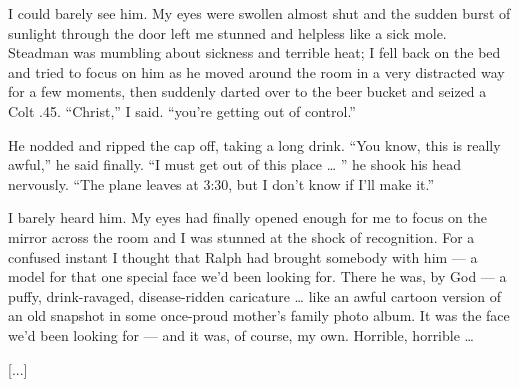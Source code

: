 \documentclass[10pt,a4paper]{article}
\begin{document}
I could barely see him. My eyes were swollen almost shut and the sudden burst of sunlight through the door left me stunned and helpless like a sick mole. Steadman was mumbling about sickness and terrible heat; I fell back on the bed and tried to focus on him as he moved around the room in a very distracted way for a few moments, then suddenly darted over to the beer bucket and seized a Colt .45. “Christ,” I said. “you’re getting out of control.”

He nodded and ripped the cap off, taking a long drink. “You know, this is really awful,” he said finally. “I must get out of this place … ” he shook his head nervously. “The plane leaves at 3:30, but I don’t know if I’ll make it.”

I barely heard him. My eyes had finally opened enough for me to focus on the mirror across the room and I was stunned at the shock of recognition. For a confused instant I thought that Ralph had brought somebody with him — a model for that one special face we’d been looking for. There he was, by God — a puffy, drink-ravaged, disease-ridden caricature … like an awful cartoon version of an old snapshot in some once-proud mother’s family photo album. It was the face we’d been looking for — and it was, of course, my own. Horrible, horrible …

[...]
\end{document}
